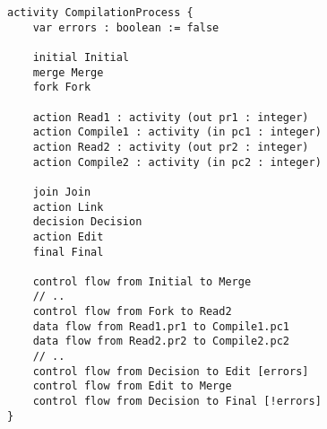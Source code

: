 \begin{lstlisting}[float,language=activity, caption={Gamma Activity Language representation of the compilation activity.}, label={lst:gamma-activity}, linewidth=0.75\textwidth, xleftmargin=0.25\textwidth]
activity CompilationProcess {
	var errors : boolean := false
	
	initial Initial
	merge Merge
	fork Fork
	
	action Read1 : activity (out pr1 : integer)
	action Compile1 : activity (in pc1 : integer)
	action Read2 : activity (out pr2 : integer)
	action Compile2 : activity (in pc2 : integer)
	
	join Join
	action Link
	decision Decision
	action Edit
	final Final
	
	control flow from Initial to Merge 
	// ..
	control flow from Fork to Read2
	data flow from Read1.pr1 to Compile1.pc1
	data flow from Read2.pr2 to Compile2.pc2
	// ..
	control flow from Decision to Edit [errors]
	control flow from Edit to Merge
	control flow from Decision to Final [!errors]
}
\end{lstlisting}